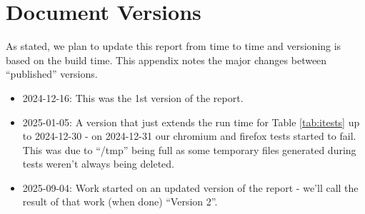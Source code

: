 \section{Document Versions}
\label{app:versions}

As stated, we plan to update this report from time to time and versioning
is based on the build time. This appendix notes the major changes between
``published'' versions.

\begin{itemize}

\item 2024-12-16: This was the 1st version of the report.

\item 2025-01-05: A version that just extends the run time for Table
    \ref{tab:itests} up to 2024-12-30 - on 2024-12-31 our chromium and firefox
        tests started to fail. This was due to ``/tmp'' being full as some
        temporary files generated during tests weren't always being deleted.

\item 2025-09-04: Work started on an updated version of the report - we'll call
    the result of that work (when done) ``Version 2''.

\end{itemize}
